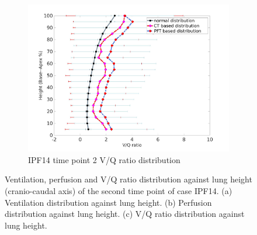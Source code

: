 \begin{figure}[htbp]
\begin{subfigure}{.6\linewidth}
  \includegraphics[width=\linewidth,trim={{.0\wd0} {.0\wd0} {.0\wd0} {.0\wd0}},clip]{Appendix/Image_AppexB/IPF1402/IPF1402_VQAgainstLungHeight.png}
  \caption{IPF14 time point 2 V/Q ratio distribution}
  \label{fig:VQDistribution-c}
\end{subfigure}
\caption{ Ventilation, perfusion and V/Q ratio distribution against lung height (cranio-caudal axis) of the second time point of case IPF14. (a) Ventilation distribution against lung height. (b) Perfusion distribution against lung height. (c) V/Q ratio distribution against lung height.}
\label{fig:VQDistribution}
\end{figure}
